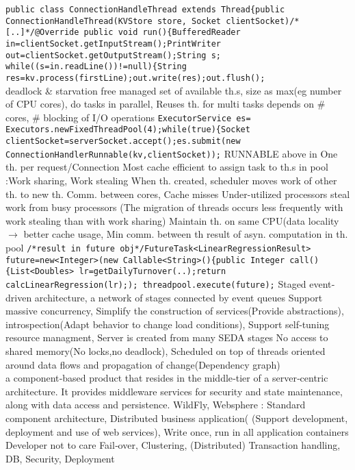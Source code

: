 \lstinline{public class ConnectionHandleThread extends Thread{public ConnectionHandleThread(KVStore store, Socket clientSocket)/*[..]*/@Override public void run(){BufferedReader in=clientSocket.getInputStream();PrintWriter out=clientSocket.getOutputStream();String s; while((s=in.readLine())!=null){String res=kv.process(firstLine);out.write(res);out.flush();}
\\
deadlock \& starvation free
managed set of available th.s,
size as max(eg number of CPU cores),
do tasks in parallel,
Reuses th. for multi tasks
depends on \# cores, \# blocking of I/O operations
\lstinline{ExecutorService es= Executors.newFixedThreadPool(4);while(true){Socket clientSocket=serverSocket.accept();es.submit(new ConnectionHandlerRunnable(kv,clientSocket));}
\bluetext{++:}
RUNNABLE above in One th. per request/Connection
Most cache efficient to assign task to th.s in pool
:Work sharing, Work stealing
When th. created, scheduler moves work of other th. to new th.
\btext{--:}
Comm. between cores, Cache misses
Under-utilized processors steal work from busy processors
(The migration of threads occurs less frequently with work stealing than with work sharing)
\redtext{++:}
Maintain th. on same CPU(data locality
$\rightarrow$
better cache usage, 
Min comm. between th
%
%
result of asyn. computation in th. pool
\lstinline{/*result in future obj*/FutureTask<LinearRegressionResult> future=new<Integer>(new Callable<String>(){public Integer call() {List<Doubles> lr=getDailyTurnover(..);return calcLinearRegression(lr);); threadpool.execute(future);}
%
%
Staged event‐driven architecture, a network of stages connected by event queues
\btext{++:}
Support massive concurrency,
Simplify the construction of services(Provide abstractions),
introspection(Adapt behavior to change load conditions),
Support self‐tuning resource managment,
Server is created from many SEDA stages
%
%
No access to shared memory(No locks,no deadlock), 
Scheduled on top of threads
%
%
oriented around data flows and propagation of change(Dependency graph)
\\
a component‐based product that resides in the middle‐tier of a server‐centric architecture.
It provides middleware services for security and state maintenance, 
along with data access and persistence.
WildFly, Websphere
\textbar
{}:
Standard component architecture,
Distributed business application(
(Support development, deployment and use of web services),
Write once, run in all application containers
\btext{++:}
Developer not to care Fail‐over, 
Clustering, 
(Distributed) Transaction handling, 
DB, 
Security, 
Deployment